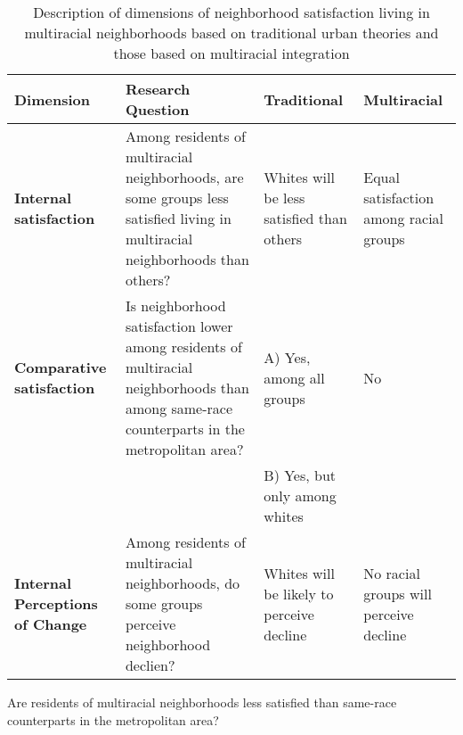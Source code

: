 


\begin{sidewaystable}
\caption{Description of dimensions of neighborhood satisfaction living in multiracial neighborhoods based on traditional urban theories and those based on multiracial integration}
\label{tab:theory}
\begin{tabular}{L{2in}L{2in}L{2in}L{2in}}
\textbf{Dimension} & \textbf{Research Question} & \textbf{Traditional} & \textbf{Multiracial} \\\toprule
\textbf{Internal satisfaction} & Among residents of multiracial neighborhoods, are some groups less satisfied living in multiracial neighborhoods than others? & Whites will be less satisfied than others & Equal satisfaction among racial groups \\\midrule
\textbf{Comparative satisfaction} & Is neighborhood satisfaction lower among residents of multiracial neighborhoods than among same-race counterparts in the metropolitan area? & A) Yes, among all groups & No \\
&  & B) Yes, but only among whites & \\\midrule
\textbf{Internal Perceptions of Change} & Among residents of multiracial neighborhoods, do some groups perceive neighborhood declien? & Whites will be likely to perceive decline & No racial groups will perceive decline \\\bottomrule
\end{tabular}
\end{sidewaystable}
Are residents of multiracial neighborhoods less satisfied than same-race counterparts in the metropolitan area?